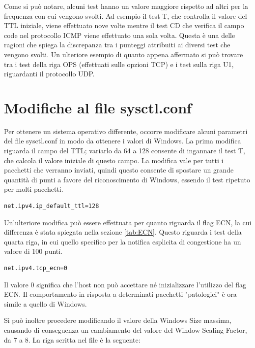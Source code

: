 Come si può notare, alcuni test hanno un valore maggiore rispetto ad altri per la frequenza con cui vengono svolti. Ad esempio il test T, che controlla il valore del TTL iniziale, viene effettuato nove volte mentre il test CD che verifica il campo code nel protocollo ICMP viene effettuato una sola volta.
Questa è una delle ragioni che spiega la discrepanza tra i punteggi attribuiti ai diversi test che vengono svolti.
Un ulteriore esempio di quanto appena affermato si può trovare tra i test della riga OPS (effettuati sulle opzioni TCP) e i test sulla riga U1, riguardanti il protocollo UDP.


\section{Modifiche al file sysctl.conf}
Per ottenere un sistema operativo differente, occorre modificare alcuni parametri del file sysctl.conf in modo da ottenere i valori di Windows.
La prima modifica riguarda il campo del TTL; variarlo da 64 a 128 consente di ingannare il test T, che calcola il valore iniziale di questo campo. La modifica vale per tutti i pacchetti che verranno inviati, quindi questo consente di spostare un grande quantità di punti a favore del riconoscimento di Windows, essendo il test ripetuto per molti pacchetti.

\begin{lstlisting}[caption={Modifica al campo TTL nel file sysctl.conf}, label=listing_ttl]
	net.ipv4.ip_default_ttl=128
\end{lstlisting}

Un'ulteriore modifica può essere effettuata per quanto riguarda il flag ECN, la cui differenza è stata spiegata nella sezione \ref{tab:ECN}. Questo riguarda i test della quarta riga, in cui quello specifico per la notifica esplicita di congestione ha un valore di 100 punti.

\begin{lstlisting}[caption={Modifica al campo ECN nel file sysctl.conf}]
	net.ipv4.tcp_ecn=0
\end{lstlisting} 

Il valore 0 significa che l'host non può accettare né inizializzare l'utilizzo del flag ECN. Il comportamento in risposta a determinati pacchetti "patologici" è ora simile a quello di Windows.

Si può inoltre procedere modificando il valore della Windows Size massima, causando di conseguenza un cambiamento del valore del Window Scaling Factor, da 7 a 8. 
La riga scritta nel file è la seguente:

